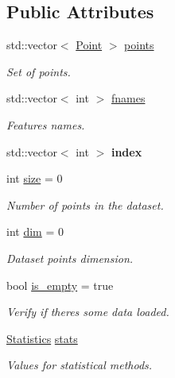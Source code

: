 \subsection*{Public Attributes}
\begin{DoxyCompactItemize}
\item 
\mbox{\label{class_data_a351597c4fca22a1ec5c87145cb44689d}} 
std\+::vector$<$ \hyperlink{class_point}{Point} $>$ \hyperlink{class_data_a351597c4fca22a1ec5c87145cb44689d}{points}
\begin{DoxyCompactList}\small\item\em Set of points. \end{DoxyCompactList}\item 
\mbox{\label{class_data_a999aba95f0c89626c4a1703aa0ec32a3}} 
std\+::vector$<$ int $>$ \hyperlink{class_data_a999aba95f0c89626c4a1703aa0ec32a3}{fnames}
\begin{DoxyCompactList}\small\item\em Features names. \end{DoxyCompactList}\item 
\mbox{\label{class_data_a084ffb2a4f0c22eecd225bec65d1fded}} 
std\+::vector$<$ int $>$ {\bfseries index}
\item 
\mbox{\label{class_data_a554d30dd485385a9c817198cfbf095d8}} 
int \hyperlink{class_data_a554d30dd485385a9c817198cfbf095d8}{size} = 0
\begin{DoxyCompactList}\small\item\em Number of points in the dataset. \end{DoxyCompactList}\item 
\mbox{\label{class_data_a1012a0abcf17048fb7b75c18689a2811}} 
int \hyperlink{class_data_a1012a0abcf17048fb7b75c18689a2811}{dim} = 0
\begin{DoxyCompactList}\small\item\em Dataset points dimension. \end{DoxyCompactList}\item 
\mbox{\label{class_data_a6c9865c4a6b11b8cbc59dcddb90fdc5d}} 
bool \hyperlink{class_data_a6c9865c4a6b11b8cbc59dcddb90fdc5d}{is\+\_\+empty} = true
\begin{DoxyCompactList}\small\item\em Verify if there\textquotesingle{}s some data loaded. \end{DoxyCompactList}\item 
\mbox{\label{class_data_a9f761e3ff27ae21cdad00be62516fc6a}} 
\hyperlink{class_statistics}{Statistics} \hyperlink{class_data_a9f761e3ff27ae21cdad00be62516fc6a}{stats}
\begin{DoxyCompactList}\small\item\em Values for statistical methods. \end{DoxyCompactList}\end{DoxyCompactItemize}


